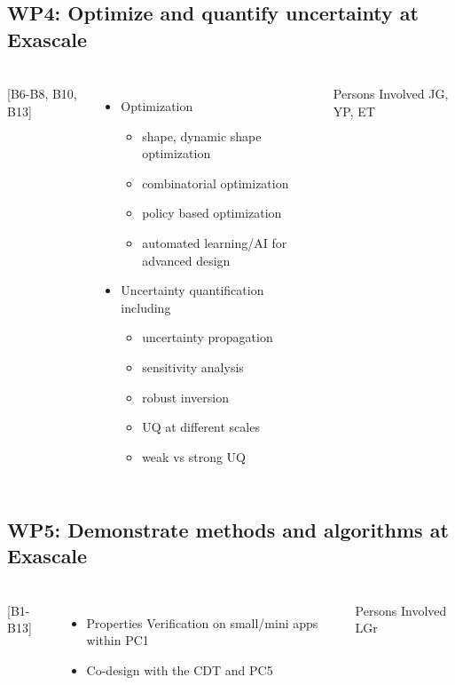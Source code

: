 \subsection{WP4: Optimize and quantify uncertainty at Exascale }
\begin{frame}
  \frametitle{\insertsectionhead}
  \framesubtitle{\insertsubsectionhead}
  \begin{columns}
    [B6-B8, B10, B13]
    \begin{itemize}
      \item Optimization 
      \begin{itemize}
        \item shape, dynamic shape optimization
        \item combinatorial optimization
        \item policy based optimization
        \item automated learning/AI for advanced design
      \end{itemize}
      \item Uncertainty quantification including 
      \begin{itemize}
        \item uncertainty propagation
        \item sensitivity analysis
        \item robust inversion
        \item UQ at different scales
        \item weak vs strong UQ
      \end{itemize}
    \end{itemize}
    \begin{alertblock}{Persons Involved}
      JG, YP, ET
    \end{alertblock}
  \end{columns}
\end{frame}
\subsection{WP5: Demonstrate methods and algorithms at Exascale}
\begin{frame}
  \frametitle{\insertsectionhead}
  \framesubtitle{\insertsubsectionhead}

  \begin{columns}
    [B1-B13]
    \begin{itemize}
      \item Properties Verification on small/mini apps within PC1
      \item Co-design with the CDT and PC5
    \end{itemize}
    \begin{alertblock}{Persons Involved}
      LGr
    \end{alertblock}
  \end{columns}

\end{frame}
